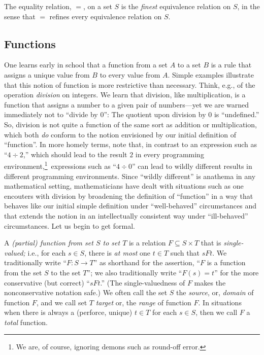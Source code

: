 \begin{theorem}
\label{thm:equality=finest-equiv}
The equality relation, $=$, on a set $S$ is the {\em finest}
equivalence relation on $S$, in the sense that $=$ refines every
equivalence relation on $S$.
\end{theorem}

\subsection{Functions}
\label{sec:function}

One learns early in school that a function from a set $A$ to a set $B$
is a rule that assigns a unique value from $B$ to every value from
$A$.  Simple examples illustrate that this notion of function is more
restrictive than necessary.  Think, e.g., of the operation {\em
  division} on integers.  We learn that division, like multiplication,
is a function that assigns a number to a given pair of numbers---yet
we are warned immediately not to ``divide by $0$'': The quotient upon
division by $0$ is ``undefined.''  So, division is not quite a
function of the same sort as addition or multiplication, which both
{\em do} conform to the notion envisioned by our initial definition of
``function''.  In more homely terms, note that, in contrast to an
expression such as ``$4 \div 2$,'' which should lead to the result $2$
in every programming environment,\footnote{We are, of course, ignoring
  demons such as round-off error.}~expressions such as ``$4 \div 0$''
can lead to wildly different results in different programming
environments.  Since ``wildly different'' is anathema in any
mathematical setting, mathematicians have dealt with situations such
as one encouters with division by broadening the definition of
``function'' in a way that behaves like our initial simple definition
under ``well-behaved'' circumstances and that extends the notion in an
intellectually consistent way under ``ill-behaved'' circumstances.
Let us begin to get formal.

A {\it (partial) function from set $S$ to set $T$} is a relation $F
\subseteq S \times T$ that is {\it single-valued;} i.e., for each $s
\in S$, there is {\em at most} one $t \in T$ such that $sFt$.  We
traditionally write ``$F: S \rightarrow T$'' as shorthand for the
assertion, ``$F$ is a function from the set $S$ to the set $T$''; we
also traditionally write ``$F(s) = t$'' for the more conservative (but
correct) ``$sFt$.''  (The single-valuedness of $F$ makes the
nonconservative notation safe.)  We often call the set $S$ the {\em
  source},  or, {\it domain}
 of function $F$, and we call set $T$ {\em
  target}  or, the {\it range}
 of function $F$.  In situations when there is
always a (perforce, unique) $t \in T$ for each $s \in S$, then we call
$F$ a {\em total} function.

